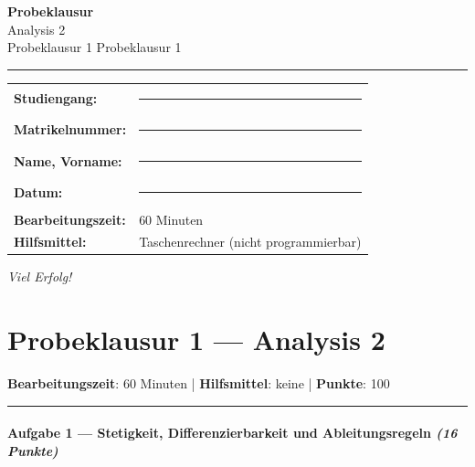 \documentclass[11pt, a4paper]{article}
\providecommand{\nichttitle}{Probeklausur}
\providecommand{\nichtsubtitle}{}
\renewcommand{\nichttitle}{Analysis 2}
\renewcommand{\nichtsubtitle}{Probeklausur 1}
\begin{document}
\thispagestyle{empty}
\begin{center}
\vspace*{1cm}
{\Huge\bfseries\color{accent}Probeklausur}\\[8pt]
{\Large\color{accent}\nichttitle}\\[4pt]
\ifx\nichtsubtitle\empty\else
  {\large\color{accent!80!black}\nichtsubtitle}\\[6pt]
\fi
\color{accent}\rule{0.5\linewidth}{1pt}\color{black}
\end{center}

\vspace{1cm}
\begin{tabularx}{\textwidth}{@{}l X@{}}
\textbf{Studiengang:}      & \rule{6cm}{0.4pt} \\[6pt]
\textbf{Matrikelnummer:}    & \rule{6cm}{0.4pt} \\[6pt]
\textbf{Name, Vorname:}    & \rule{6cm}{0.4pt} \\[6pt]
\textbf{Datum:}             & \rule{6cm}{0.4pt} \\[6pt]
\textbf{Bearbeitungszeit:}  & 60 Minuten \\[6pt]
\textbf{Hilfsmittel:}       & Taschenrechner (nicht programmierbar) \\
\end{tabularx}

\vspace{2cm}
\begin{center}
{\large\itshape Viel Erfolg!}
\end{center}

\newpage


\section{Probeklausur 1 — Analysis 2}

\textbf{Bearbeitungszeit}: 60 Minuten | \textbf{Hilfsmittel}: keine | \textbf{Punkte}: 100



\noindent\textcolor{rulegray}{\rule{\linewidth}{0.4pt}}


\paragraph{Aufgabe 1 — Stetigkeit, Differenzierbarkeit und Ableitungsregeln \textit{(16 Punkte)}}\mbox{}\\[2pt]
\end{document}
